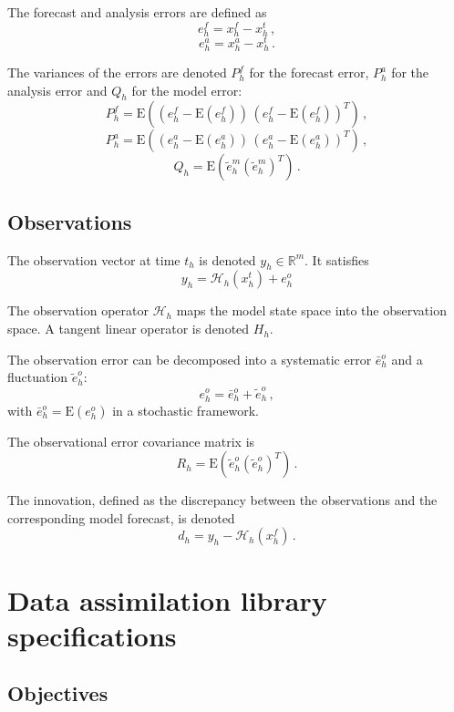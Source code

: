 \documentclass{tufte-book}
\begin{document}
\-The forecast and analysis errors are defined as \[e^f_h = x^f_h - x^t_h\,,\] \[e^a_h = x^a_h - x^t_h\,.\]

\-The variances of the errors are denoted $P^f_h$ for the forecast error, $P^a_h$ for the analysis error and $Q_h$ for the model error\-: \[P^f_h = \mathrm{E}\left(\left(e^f_h - \mathrm{E}(e^f_h)\right)\,\left(e^f_h - \mathrm{E}(e^f_h)\right)^T\right)\,,\] \[P^a_h = \mathrm{E}\left(\left(e^a_h - \mathrm{E}(e^a_h)\right)\,\left(e^a_h - \mathrm{E}(e^a_h)\right)^T\right)\,,\] \[Q_h = \mathrm{E}\left(\tilde e^m_h (\tilde e^m_h)^T\right)\,.\]

\hypertarget{notation_observations}{}\subsection{\-Observations}\label{notation_observations}

\-The observation vector at time $t_h$ is denoted $y_h \in \mathbb{R}^m$. \-It satisfies \[y_h = \mathcal{H}_h(x^t_h) + e^o_h\]

\-The observation operator $\mathcal{H}_h$ maps the model state space into the observation space. \-A tangent linear operator is denoted $H_h$.

\-The observation error can be decomposed into a systematic error $\bar e^o_h$ and a fluctuation $\tilde e^o_h$\-: \[e^o_h = \bar e^o_h + \tilde e^o_h\,,\] with $\bar e^o_h = \mathrm{E}(e^o_h)$ in a stochastic framework.

\-The observational error covariance matrix is \[R_h = \mathrm{E}\left(\tilde e^o_h (\tilde e^o_h)^T\right)\,.\]

\-The innovation, defined as the discrepancy between the observations and the corresponding model forecast, is denoted \[d_h = y_h - \mathcal{H}_h(x^f_h)\,.\]


\section{Data assimilation library specifications}


\subsection{Objectives}\label{sec:objectives}
\end{document}
